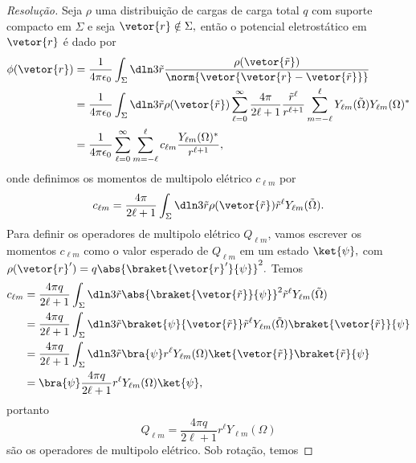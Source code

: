 \begin{proof}[Resolução]
   Seja \(\rho\) uma distribuição de cargas de carga total \(q\) com suporte compacto em \(\Sigma\) e seja \(\vetor{r} \notin \Sigma,\) então o potencial eletrostático em \(\vetor{r}\) é dado por
   \begin{align*}
      \phi(\vetor{r}) &= \frac{1}{4\pi \epsilon_0} \int_{\Sigma} \dln3{\tilde{r}} \frac{\rho(\vetor{\tilde{r}})}{\norm{\vetor{\vetor{r} - \vetor{\tilde{r}}}}}\\
                      &= \frac{1}{4\pi \epsilon_0} \int_{\Sigma}\dln3{\tilde{r}}\rho(\vetor{\tilde{r}})\sum_{\ell = 0}^\infty{\frac{4\pi}{2\ell + 1}\frac{\tilde{r}^\ell}{r^{\ell + 1}}\sum_{m = - \ell}^\ell{Y_{\ell m}(\tilde{\Omega})Y_{\ell m}(\Omega)^*}}\\
                      &= \frac{1}{4\pi \epsilon_0}\sum_{\ell = 0}^\infty{\sum_{m = - \ell}^\ell{c_{\ell m} \frac{Y_{\ell m}(\Omega)^*}{r^{\ell + 1}}}},
   \end{align*}
   onde definimos os momentos de multipolo elétrico \(c_{\ell m}\) por
   \begin{equation*}
      c_{\ell m} = \frac{4\pi}{2\ell + 1} \int_{\Sigma}\dln3{\tilde{r}} \rho(\vetor{\tilde{r}}) \tilde{r}^\ell Y_{\ell m}(\tilde{\Omega}).
   \end{equation*}
   Para definir os operadores de multipolo elétrico \(Q_{\ell m}\), vamos escrever os momentos \(c_{\ell m}\) como o valor esperado de \(Q_{\ell m}\) em um estado \(\ket{\psi},\) com \(\rho(\vetor{r}') = q\abs{\braket{\vetor{r}'}{\psi}}^2.\) Temos
   \begin{align*}
      c_{\ell m} &= \frac{4\pi q}{2\ell + 1} \int_{\Sigma}\dln3{\tilde{r}} \abs{\braket{\vetor{\tilde{r}}}{\psi}}^2 \tilde{r}^\ell Y_{\ell m}(\tilde{\Omega})\\
                 &= \frac{4\pi q}{2\ell + 1} \int_{\Sigma} \dln3{\tilde{r}} \braket{\psi}{\vetor{\tilde{r}}} \tilde{r}^\ell Y_{\ell m}(\tilde{\Omega}) \braket{\vetor{\tilde{r}}}{\psi}\\
                 &= \frac{4\pi q}{2\ell + 1} \int_{\Sigma}\dln3{\tilde{r}}\bra{\psi}r^\ell Y_{\ell m}(\Omega) \ket{\vetor{\tilde{r}}} \braket{\tilde{r}}{\psi}\\
                 &= \bra{\psi}\frac{4\pi q}{2\ell + 1} r^\ell Y_{\ell m}(\Omega)\ket{\psi},
   \end{align*}
   portanto
   \begin{equation*}
      Q_{\ell m} = \frac{4\pi q}{2\ell + 1} r^{\ell} Y_{\ell m}(\Omega)
   \end{equation*}
   são os operadores de multipolo elétrico. Sob rotação, temos

\end{proof}
